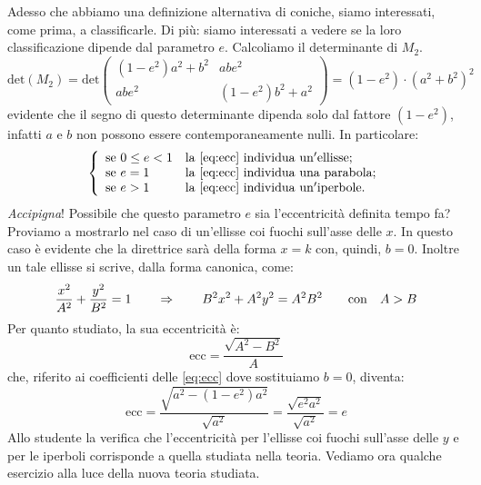 \documentclass[a4paper, oneside]{article}
\begin{document}
		Adesso che abbiamo una definizione alternativa di coniche, siamo interessati, come prima, a classificarle. Di più: siamo interessati a vedere se la loro classificazione dipende dal parametro $e$. Calcoliamo il determinante di $M_2$.
		\begin{equation*}
			\mathrm{det}(M_2) = \mathrm{det}\left(
			\begin{array}{cc}
				\left(1-e^{2}\right) a^{2}+b^{2} & abe^2 \\
				abe^2 & \left(1-e^{2}\right) b^{2}+a^{2}
			\end{array} \right) = (1-e^2)\cdot(a^2 + b^2)^2
		\end{equation*}
		\Egrave evidente che il segno di questo determinante dipenda solo dal fattore $(1-e^2)$, infatti $a$ e $b$ non possono essere contemporaneamente nulli. In particolare:
		\begin{equation*}
			\left\{
			\begin{array}{ll}
				\mathrm{se}\ 0\leq e < 1 & \mathrm{la\ \eqref{eq:ecc}\ individua\ un'ellisse;} \\
				\mathrm{se}\ e=1 & \mathrm{la\ \eqref{eq:ecc}\ individua\ una\ parabola;} \\
				\mathrm{se}\ e>1 & \mathrm{la\ \eqref{eq:ecc}\ individua\ un'iperbole.}
			\end{array} \right.
		\end{equation*}
		\emph{Accipigna}! Possibile che questo parametro $e$ sia l'eccentricità definita tempo fa?
		Proviamo a mostrarlo nel caso di un'ellisse coi fuochi sull'asse delle $x$. In questo caso è evidente che la direttrice sarà della forma $x=k$ con, quindi, $b=0$. Inoltre un tale ellisse si scrive, dalla forma canonica, come:
		\begin{equation*}
			\frac{x^2}{A^2}+\frac{y^2}{B^2}=1 \qquad \Rightarrow \qquad B^2x^2 + A^2y^2=A^2B^2 \qquad \mathrm{con} \quad A>B
		\end{equation*}
		Per quanto studiato, la sua eccentricità è:
		\begin{equation*}
			\mathrm{ecc}=\frac{\sqrt{A^2-B^2}}{A}
		\end{equation*}
		che, riferito ai coefficienti delle \eqref{eq:ecc} dove sostituiamo $b=0$, diventa:
		\begin{equation*}
			\mathrm{ecc}=\frac{\sqrt{a^2-(1-e^2)a^2}}{\sqrt{a^2}}=\frac{\sqrt{e^2a^2}}{\sqrt{a^2}}=e
		\end{equation*}
		Allo studente la verifica che l'eccentricità per l'ellisse coi fuochi sull'asse delle $y$ e per le iperboli corrisponde a quella studiata nella teoria.
		Vediamo ora qualche esercizio alla luce della nuova teoria studiata.
		
\end{document}
